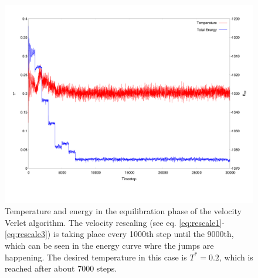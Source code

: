 \documentclass[12pt]{article}
\begin{document}
\begin{figure}[h]
    \begin{center}
        \includegraphics[scale=0.3]{images/verlet_output_te.pdf}
        \caption{Temperature and energy in the equilibration phase of the velocity Verlet algorithm. The velocity rescaling (see eq. 
        \eqref{eq:rescale1}-\eqref{eq:rescale3}) is taking place every 1000th step until the 9000th, which can be seen in the energy curve whre the
    jumps are happening. The desired temperature in this case is $T^* = 0.2$, which is reached after about 7000 steps.}
        \label{fig:energystart}
    \end{center}
\end{figure}
\end{document}
